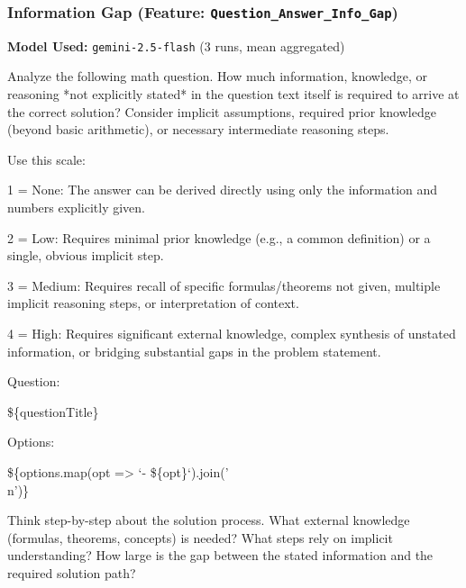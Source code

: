 \documentclass[
    a4paper, %
    10pt, %
    twoside, %
]{LTJournalArticle}
\begin{document}
\subsubsection{Information Gap (Feature: \texttt{Question\_Answer\_Info\_Gap})}
\label{app:prompt_info_gap}
\textbf{Model Used:} \texttt{gemini-2.5-flash} (3 runs, mean aggregated)
\begin{promptbox}
Analyze the following math question. How much information, knowledge, or reasoning *not explicitly stated* in the question text itself is required to arrive at the correct solution? Consider implicit assumptions, required prior knowledge (beyond basic arithmetic), or necessary intermediate reasoning steps.

\vspace{1em}

Use this scale:

1 = None: The answer can be derived directly using only the information and numbers explicitly given.

2 = Low: Requires minimal prior knowledge (e.g., a common definition) or a single, obvious implicit step.

3 = Medium: Requires recall of specific formulas/theorems not given, multiple implicit reasoning steps, or interpretation of context.

4 = High: Requires significant external knowledge, complex synthesis of unstated information, or bridging substantial gaps in the problem statement.

\vspace{1em}

Question:

\$\{questionTitle\}

\vspace{1em}

Options:

\$\{options.map(opt => `- \$\{opt\}`).join('\\n')\}

\vspace{1em}

Think step-by-step about the solution process. What external knowledge (formulas, theorems, concepts) is needed? What steps rely on implicit understanding? How large is the gap between the stated information and the required solution path?
\end{promptbox}
\end{document}
